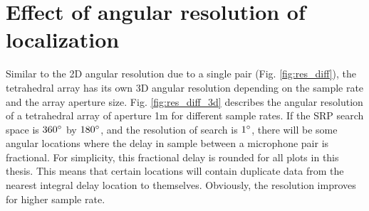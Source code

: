 \section{Effect of angular resolution of localization}\label{app:angRes}
Similar to the 2D angular resolution due to a single pair (Fig. \ref{fig:res_diff}), the tetrahedral array has its own 3D  angular resolution depending on the sample rate and the array aperture size. Fig. \ref{fig:res_diff_3d} describes the angular resolution of a tetrahedral array of aperture 1m for different sample rates. If the SRP search space is $360\degree$ by $180\degree$, and the resolution of search is $1\degree$, there will be some angular locations where the delay in sample between a microphone pair is fractional. For simplicity, this fractional delay is rounded for all plots in this thesis. This means that certain locations will contain duplicate data from the nearest integral delay location to themselves. Obviously, the resolution improves for higher sample rate.
